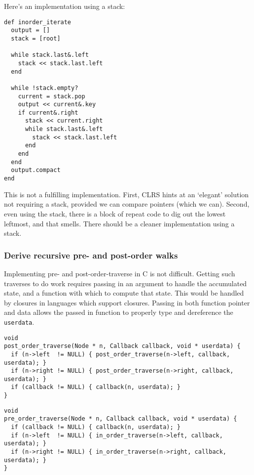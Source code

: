 \documentclass{article}
\begin{document}
Here's an implementation using a stack:

\begin{lstlisting}[frame=single,title=Iterative inorder traverse]
def inorder_iterate
  output = []
  stack = [root]

  while stack.last&.left
    stack << stack.last.left
  end

  while !stack.empty?
    current = stack.pop
    output << current&.key
    if current&.right
      stack << current.right
      while stack.last&.left
        stack << stack.last.left
      end
    end
  end
  output.compact
end
\end{lstlisting}

This is not a fulfilling implementation. First, CLRS hints at an
`elegant' solution not requiring a stack, provided we can compare pointers
(which we can). Second, even using the stack, there is a block of
repeat code to dig out the lowest leftmost, and that smells. There should
be a cleaner implementation using a stack.


\subsubsection{Derive recursive pre- and post-order walks}

Implementing pre- and post-order-traverse in C is not difficult. Getting
such traverses to do work requires passing in an argument to handle
the accumulated state, and a function with which to compute that state.
This would be handled by closures in languages which support closures.
Passing in both function pointer and data allows the passed in function
to properly type and dereference the \texttt{userdata}.

\begin{lstlisting}[frame=single,title=Post-order traverse]
void
post_order_traverse(Node * n, Callback callback, void * userdata) {
  if (n->left  != NULL) { post_order_traverse(n->left, callback, userdata); }
  if (n->right != NULL) { post_order_traverse(n->right, callback, userdata); }
  if (callback != NULL) { callback(n, userdata); }
}
\end{lstlisting}

\begin{lstlisting}[frame=single,title=Pre-order traverse]
void
pre_order_traverse(Node * n, Callback callback, void * userdata) {
  if (callback != NULL) { callback(n, userdata); }
  if (n->left  != NULL) { in_order_traverse(n->left, callback, userdata); }
  if (n->right != NULL) { in_order_traverse(n->right, callback, userdata); }
}
\end{lstlisting}
\end{document}
